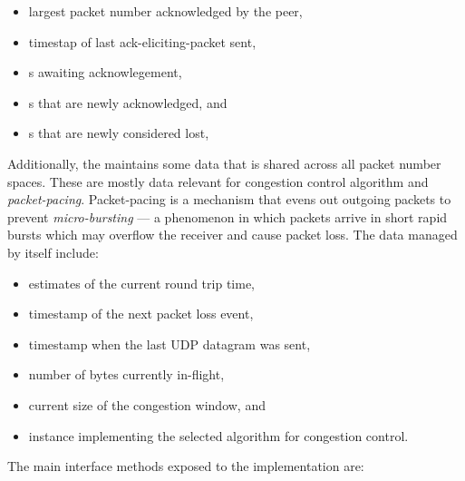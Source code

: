\begin{itemize}

  \item largest packet number acknowledged by the peer,

  \item timestap of last \gls{ack-eliciting-packet} sent,

  \item \SentPacket{}s awaiting acknowlegement,

  \item \SentPacket{}s that are newly acknowledged, and

  \item \SentPacket{}s that are newly considered lost,

\end{itemize}

Additionally, the \RecoveryController{} maintains some data that is shared across all packet number
spaces. These are mostly data relevant for congestion control algorithm and
\textit{\gls{packet-pacing}}. Packet-pacing is a mechanism that evens out outgoing packets to
prevent \textit{\gls{micro-bursting}} --- a phenomenon in which packets arrive in short rapid bursts which may
overflow the receiver and cause packet loss. The data managed by \RecoveryController{}
itself include:

\begin{itemize}

  \item estimates of the current round trip time,

  \item timestamp of the next packet loss event,

  \item timestamp when the last UDP datagram was sent,

  \item number of bytes currently in-flight,

  \item current size of the congestion window, and

  \item \ICongestionController{} instance implementing the selected algorithm for congestion control.

\end{itemize}

The main interface methods exposed to the \ManagedQuicConnection{} implementation are:

